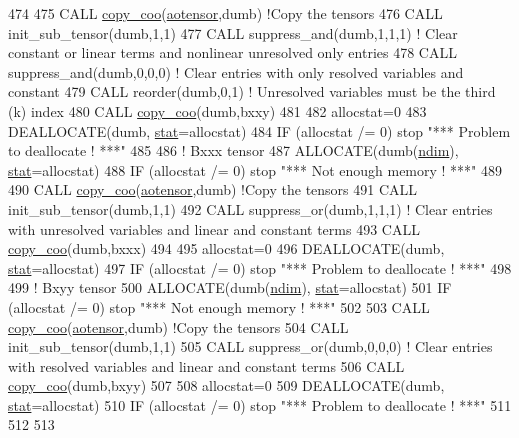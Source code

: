 \begin{DoxyCode}
474 
475     \textcolor{keyword}{CALL }\hyperlink{namespacetensor_a14f95c256cdf137ca0767ddb3c87deea}{copy\_coo}(\hyperlink{namespaceaotensor__def_a0dc43bc9294a18f2fe57b67489f1702f}{aotensor},dumb) \textcolor{comment}{!Copy the tensors}
476     \textcolor{keyword}{CALL }init\_sub\_tensor(dumb,1,1)
477     \textcolor{keyword}{CALL }suppress\_and(dumb,1,1,1) \textcolor{comment}{! Clear constant or linear terms and nonlinear unresolved only entries}
478     \textcolor{keyword}{CALL }suppress\_and(dumb,0,0,0) \textcolor{comment}{! Clear entries with only resolved variables and constant}
479     \textcolor{keyword}{CALL }reorder(dumb,0,1) \textcolor{comment}{! Unresolved variables must be the third (k) index}
480     \textcolor{keyword}{CALL }\hyperlink{namespacetensor_a14f95c256cdf137ca0767ddb3c87deea}{copy\_coo}(dumb,bxxy)
481 
482     allocstat=0
483     \textcolor{keyword}{DEALLOCATE}(dumb, \hyperlink{namespacestat}{stat}=allocstat)
484     \textcolor{keywordflow}{IF} (allocstat /= 0)  stop \textcolor{stringliteral}{"*** Problem to deallocate ! ***"}
485 
486     \textcolor{comment}{! Bxxx tensor}
487     \textcolor{keyword}{ALLOCATE}(dumb(\hyperlink{namespaceparams_a2323fe1773f086e20c14f266351c482b}{ndim}), \hyperlink{namespacestat}{stat}=allocstat)
488     \textcolor{keywordflow}{IF} (allocstat /= 0) stop \textcolor{stringliteral}{"*** Not enough memory ! ***"}
489 
490     \textcolor{keyword}{CALL }\hyperlink{namespacetensor_a14f95c256cdf137ca0767ddb3c87deea}{copy\_coo}(\hyperlink{namespaceaotensor__def_a0dc43bc9294a18f2fe57b67489f1702f}{aotensor},dumb) \textcolor{comment}{!Copy the tensors}
491     \textcolor{keyword}{CALL }init\_sub\_tensor(dumb,1,1)
492     \textcolor{keyword}{CALL }suppress\_or(dumb,1,1,1) \textcolor{comment}{! Clear entries with unresolved variables and linear and constant terms}
493     \textcolor{keyword}{CALL }\hyperlink{namespacetensor_a14f95c256cdf137ca0767ddb3c87deea}{copy\_coo}(dumb,bxxx)
494 
495     allocstat=0
496     \textcolor{keyword}{DEALLOCATE}(dumb, \hyperlink{namespacestat}{stat}=allocstat)
497     \textcolor{keywordflow}{IF} (allocstat /= 0)  stop \textcolor{stringliteral}{"*** Problem to deallocate ! ***"}
498 
499     \textcolor{comment}{! Bxyy tensor}
500     \textcolor{keyword}{ALLOCATE}(dumb(\hyperlink{namespaceparams_a2323fe1773f086e20c14f266351c482b}{ndim}), \hyperlink{namespacestat}{stat}=allocstat)
501     \textcolor{keywordflow}{IF} (allocstat /= 0) stop \textcolor{stringliteral}{"*** Not enough memory ! ***"}
502 
503     \textcolor{keyword}{CALL }\hyperlink{namespacetensor_a14f95c256cdf137ca0767ddb3c87deea}{copy\_coo}(\hyperlink{namespaceaotensor__def_a0dc43bc9294a18f2fe57b67489f1702f}{aotensor},dumb) \textcolor{comment}{!Copy the tensors}
504     \textcolor{keyword}{CALL }init\_sub\_tensor(dumb,1,1)
505     \textcolor{keyword}{CALL }suppress\_or(dumb,0,0,0) \textcolor{comment}{! Clear entries with resolved variables and linear and constant terms}
506     \textcolor{keyword}{CALL }\hyperlink{namespacetensor_a14f95c256cdf137ca0767ddb3c87deea}{copy\_coo}(dumb,bxyy)
507 
508     allocstat=0
509     \textcolor{keyword}{DEALLOCATE}(dumb, \hyperlink{namespacestat}{stat}=allocstat)
510     \textcolor{keywordflow}{IF} (allocstat /= 0)  stop \textcolor{stringliteral}{"*** Problem to deallocate ! ***"}
511 
512 
513 
\end{DoxyCode}
